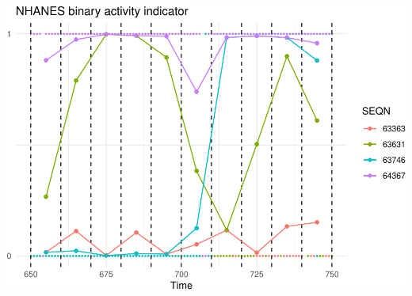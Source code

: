 \documentclass[
]{article}
\begin{document}
\includegraphics{manuscript_files/figure-latex/unnamed-chunk-13-1.pdf}
\end{document}
